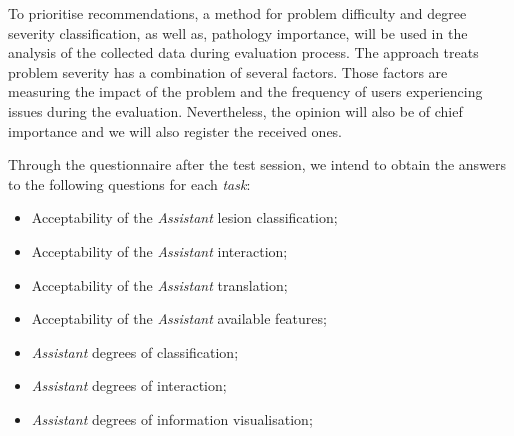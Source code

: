 \hfill


To prioritise recommendations, a method for problem difficulty and degree severity classification, as well as, pathology importance, will be used in the analysis of the collected data during evaluation process. The approach treats problem severity has a combination of several factors. Those factors are measuring the impact of the problem and the frequency of users experiencing issues during the evaluation. Nevertheless, the opinion will also be of chief importance and we will also register the received ones.

\hfill


Through the questionnaire after the test session, we intend to obtain the answers to the following questions for each \textit{task}:


\hfill

\begin{itemize}
\item Acceptability of the \textit{Assistant} lesion classification;
\item Acceptability of the \textit{Assistant} interaction;
\item Acceptability of the \textit{Assistant} translation;
\item Acceptability of the \textit{Assistant} available features;
\item \textit{Assistant} degrees of classification;
\item \textit{Assistant} degrees of interaction;
\item \textit{Assistant} degrees of information visualisation;
\end{itemize}

\hfill

